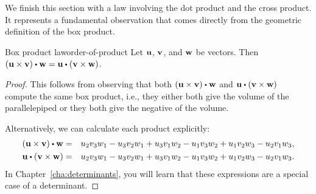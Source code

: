 We finish this section with a law involving the dot product and the
cross product. It represents a fundamental observation that comes
directly from the geometric definition of the box product.

\begin{proposition}{Box product law}{order-of-product}
  Let $\vect{u}$, $\vect{v}$, and $\vect{w}$ be vectors. Then
  $(\vect{u}\times\vect{v}) \dotprod \vect{w}=\vect{u}\dotprod
  (\vect{v}\times \vect{w})$.
\end{proposition}

\begin{proof}
  This follows from observing that both
  $(\vect{u}\times \vect{v}) \dotprod \vect{w}$ and
  $\vect{u}\dotprod (\vect{v}\times \vect{w})$ compute the same
  box product, i.e., they either both give the volume of the
  parallelepiped or they both give the negative of the volume.

  Alternatively, we can calculate each product explicitly:
  \begin{eqnarray*}
    (\vect{u}\times \vect{v}) \dotprod \vect{w}
    &=&
        u_2v_3w_1 - u_3v_2w_1
      + u_3v_1w_2 - u_1v_3w_2
        + u_1v_2w_3 - u_2v_1w_3,\\
    \vect{u}\dotprod (\vect{v}\times \vect{w})
    &=&
        u_2v_3w_1 - u_3v_2w_1
      + u_3v_1w_2 - u_1v_3w_2
        + u_1v_2w_3 - u_2v_1w_3.
  \end{eqnarray*}
  In Chapter~\ref{cha:determinants}, you will learn that these
  expressions are a special case of a determinant.
\end{proof}

